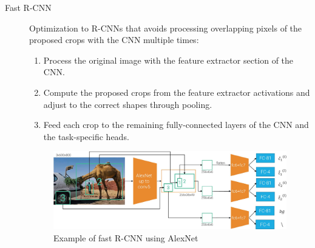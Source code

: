 \begin{description}
    \item[Fast R-CNN] 
        Optimization to R-CNNs that avoids processing overlapping pixels of the proposed crops with the CNN multiple times:
        \begin{enumerate}
            \item Process the original image with the feature extractor section of the CNN.
            \item Compute the proposed crops from the feature extractor activations and adjust to the correct shapes through pooling.
            \item Feed each crop to the remaining fully-connected layers of the CNN and the task-specific heads.
        \end{enumerate}

        \begin{figure}[H]
            \centering
            \includegraphics[width=0.8\linewidth]{./img/_fast_r_cnn.jpg}
            \caption{Example of fast R-CNN using AlexNet}
        \end{figure}


\end{description}
